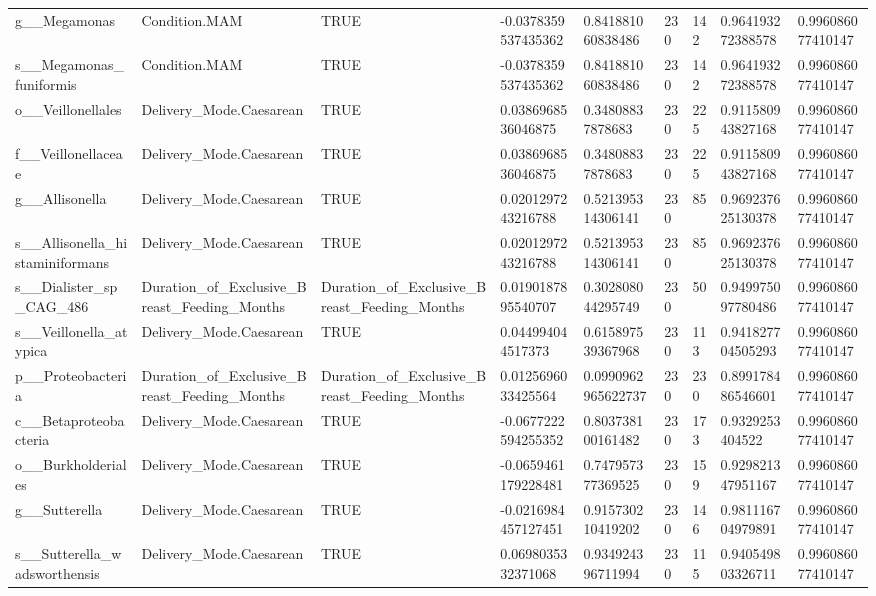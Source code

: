 \begin{longtable}{lllllllll}
g\_\_Megamonas & Condition.MAM & TRUE & -0.0378359537435362 & 0.841881060838486 & 230 & 142 & 0.964193272388578 & 0.996086077410147 \\
s\_\_Megamonas\_funiformis & Condition.MAM & TRUE & -0.0378359537435362 & 0.841881060838486 & 230 & 142 & 0.964193272388578 & 0.996086077410147 \\
o\_\_Veillonellales & Delivery\_Mode.Caesarean & TRUE & 0.0386968536046875 & 0.34808837878683 & 230 & 225 & 0.911580943827168 & 0.996086077410147 \\
f\_\_Veillonellaceae & Delivery\_Mode.Caesarean & TRUE & 0.0386968536046875 & 0.34808837878683 & 230 & 225 & 0.911580943827168 & 0.996086077410147 \\
g\_\_Allisonella & Delivery\_Mode.Caesarean & TRUE & 0.0201297243216788 & 0.521395314306141 & 230 & 85 & 0.969237625130378 & 0.996086077410147 \\
s\_\_Allisonella\_histaminiformans & Delivery\_Mode.Caesarean & TRUE & 0.0201297243216788 & 0.521395314306141 & 230 & 85 & 0.969237625130378 & 0.996086077410147 \\
s\_\_Dialister\_sp\_CAG\_486 & Duration\_of\_Exclusive\_Breast\_Feeding\_Months & Duration\_of\_Exclusive\_Breast\_Feeding\_Months & 0.0190187895540707 & 0.302808044295749 & 230 & 50 & 0.949975097780486 & 0.996086077410147 \\
s\_\_Veillonella\_atypica & Delivery\_Mode.Caesarean & TRUE & 0.044994044517373 & 0.615897539367968 & 230 & 113 & 0.941827704505293 & 0.996086077410147 \\
p\_\_Proteobacteria & Duration\_of\_Exclusive\_Breast\_Feeding\_Months & Duration\_of\_Exclusive\_Breast\_Feeding\_Months & 0.0125696033425564 & 0.0990962965622737 & 230 & 230 & 0.899178486546601 & 0.996086077410147 \\
c\_\_Betaproteobacteria & Delivery\_Mode.Caesarean & TRUE & -0.0677222594255352 & 0.803738100161482 & 230 & 173 & 0.9329253404522 & 0.996086077410147 \\
o\_\_Burkholderiales & Delivery\_Mode.Caesarean & TRUE & -0.0659461179228481 & 0.747957377369525 & 230 & 159 & 0.929821347951167 & 0.996086077410147 \\
g\_\_Sutterella & Delivery\_Mode.Caesarean & TRUE & -0.0216984457127451 & 0.915730210419202 & 230 & 146 & 0.981116704979891 & 0.996086077410147 \\
s\_\_Sutterella\_wadsworthensis & Delivery\_Mode.Caesarean & TRUE & 0.0698035332371068 & 0.934924396711994 & 230 & 115 & 0.940549803326711 & 0.996086077410147 \\

\end{longtable}
